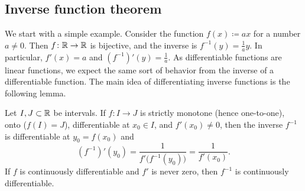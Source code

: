 \subsection{Inverse function theorem}

We start with a simple example.  Consider the function $f(x) \coloneqq a x$ for a
number $a \neq 0$.  Then $f \colon {\mathbb{R}} \to {\mathbb{R}}$ is bijective, and the inverse
is $f^{-1}(y) = \frac{1}{a} y$.  In particular, $f'(x) = a$ and 
$(f^{-1})'(y) = \frac{1}{a}$.  As differentiable functions are
 linear functions, we expect the same
sort of behavior from the inverse of a differentiable function.
The main idea of differentiating inverse functions is the following lemma.

\begin{lemma} \label{lemma:ift}
Let $I,J \subset {\mathbb{R}}$ be intervals.
If $f \colon I \to J$ is strictly monotone (hence one-to-one),
onto ($f(I) = J$),
differentiable at $x_0 \in I$, and $f'(x_0) \neq 0$,
then the inverse 
$f^{-1}$ is differentiable at $y_0 = f(x_0)$ and
\begin{equation*}
(f^{-1})'(y_0) = \frac{1}{f'\bigl( f^{-1}(y_0) \bigr)} = \frac{1}{f'(x_0)} .
\end{equation*}
If $f$ is continuously differentiable and $f'$ is never zero, then $f^{-1}$
is continuously differentiable.
\end{lemma}

